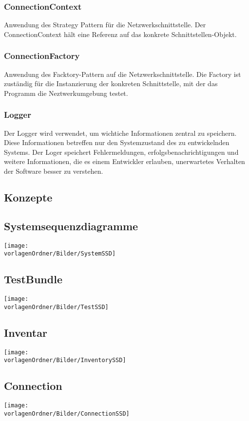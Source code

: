 \documentclass[
	ngerman,
	toc=listof, %
	toc=bibliography, %
	footnotes=multiple, %
	parskip=half, %
	numbers=noendperiod %
]{scrartcl}
\newcommand{\vorlagenOrdner}{../../99_Vorlagen} %
\begin{document}
	\subsubsection{ConnectionContext}
	Anwendung des Strategy Pattern für die Netzwerkschnittstelle. 
	Der ConnectionContext hält eine Referenz auf das konkrete Schnittstellen-Objekt.

	\subsubsection{ConnectionFactory}
	Anwendung des Facktory-Pattern auf die Netzwerkschnittstelle.
	Die Factory ist zuständig für die Instanzierung der konkreten Schnittstelle, mit der das Programm die Neztwerkumgebung testet.

	\subsubsection{Logger}
	Der Logger wird verwendet, um wichtiche Informationen zentral zu speichern. 
	Diese Informationen betreffen nur den Systemzustand des zu entwickelnden Systems.
	Der Loger speichert Fehlermeldungen, erfolgsbenachrichtigungen und weitere Informationen, die es einem Entwickler erlauben, unerwartetes Verhalten der Software besser zu verstehen.
	

	\subsection{Konzepte}


\begin{landscape}
	\section{Systemsequenzdiagramme}
		\texttt{[image: \\vorlagenOrdner/Bilder/SystemSSD]}
		\newpage
\end{landscape}
	
	\subsection{TestBundle}
		\texttt{[image: \\vorlagenOrdner/Bilder/TestSSD]}
	
	\subsection{Inventar}
		\texttt{[image: \\vorlagenOrdner/Bilder/InventorySSD]}

	\subsection{Connection}
		\texttt{[image: \\vorlagenOrdner/Bilder/ConnectionSSD]}
\end{document}
